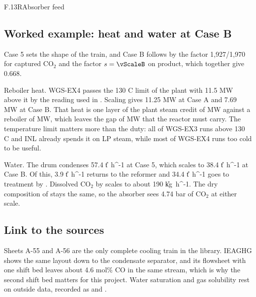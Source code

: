 \begin{eqcard}{F.13}{R}{Absorber feed}
\end{eqcard}

\subsection*{Worked example: heat and water at Case B}
Case 5 sets the shape of the train, and Case B follows by the factor 1,927/1,970 for captured CO$_2$ and the factor $s=\vScaleB$ on product, which together give 0.668.

Reboiler heat. WGS-EX4 passes the 130 C limit of the plant with 11.5 MW above it by the reading used in . Scaling gives 11.25 MW at Case A and 7.69 MW at Case B. That heat is one layer of the plant steam credit of \vQstackB{} MW against a reboiler of \vQrebB{} MW, which leaves the gap of \vQgapB{} MW that the reactor must carry. The temperature limit matters more than the duty: all of WGS-EX3 runs above 130 C and INL already spends it on LP steam, while most of WGS-EX4 runs too cold to be useful.

Water. The drum condenses 57.4 \U{t\ h^{-1}} at Case 5, which scales to 38.4 \U{t\ h^{-1}} at Case B. Of this, 3.9 \U{t\ h^{-1}} returns to the reformer and 34.4 \U{t\ h^{-1}} goes to treatment by . Dissolved CO$_2$ by  scales to about 190 \U{kg\ h^{-1}}. The dry composition of  stays the same, so the absorber sees 4.74 bar of CO$_2$ at either scale.

\subsection*{Link to the sources}
Sheets A-55 and A-56 are the only complete cooling train in the library. IEAGHG shows the same layout down to the condensate separator, and its flowsheet with one shift bed leaves about 4.6 mol\% CO in the same stream, which is why the second shift bed matters for this project. Water saturation and gas solubility rest on outside data, recorded as  and .
